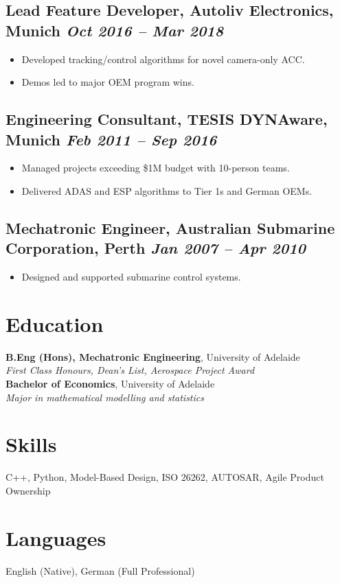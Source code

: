 \documentclass[10pt,a4paper]{article}
\begin{document}
\subsection*{Lead Feature Developer, Autoliv Electronics, Munich \hfill \textit{Oct 2016 – Mar 2018}}
\begin{itemize}
    \item Developed tracking/control algorithms for novel camera-only ACC.
    \item Demos led to major OEM program wins.
\end{itemize}

\subsection*{Engineering Consultant, TESIS DYNAware, Munich \hfill \textit{Feb 2011 – Sep 2016}}
\begin{itemize}
    \item Managed projects exceeding \$1M budget with 10-person teams.
    \item Delivered ADAS and ESP algorithms to Tier 1s and German OEMs.
\end{itemize}

\subsection*{Mechatronic Engineer, Australian Submarine Corporation, Perth \hfill \textit{Jan 2007 – Apr 2010}}
\begin{itemize}
    \item Designed and supported submarine control systems.
\end{itemize}

\vspace{1.2em}

\section*{Education}

\textbf{B.Eng (Hons), Mechatronic Engineering}, University of Adelaide \\
\textit{First Class Honours, Dean's List, Aerospace Project Award} \\[4pt]
\textbf{Bachelor of Economics}, University of Adelaide \\
\textit{Major in mathematical modelling and statistics}

\vspace{1.2em}

\section*{Skills}
C++, Python, Model-Based Design, ISO 26262, AUTOSAR, Agile Product Ownership

\vspace{1.2em}

\section*{Languages}
English (Native), German (Full Professional)
\end{document}
